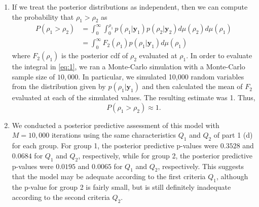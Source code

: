 \documentclass[12pt]{article}
\begin{document}
\begin{enumerate}[leftmargin=*]
\begin{enumerate}[leftmargin=1mm]
      \item If we treat the posterior distributions as independent, then we can compute the probability that $\rho_1 > \rho_2$ as
        \begin{align}
          P(\rho_1 > \rho_2) & = \int_{0}^{\infty}\int_{0}^{\rho_1}p(\rho_1|\bm{y}_1)p(\rho_2|\bm{y}_2) d\mu(\rho_2)d\mu(\rho_1) \nonumber \\
          & = \int_{0}^{\infty} F_{2}(\rho_1)p(\rho_1|\bm{y}_1) d\mu(\rho_1) \label{eq:1}
        \end{align}
        where $F_{2}(\rho_1)$ is the posterior cdf of $\rho_2$ evaluated at $\rho_1$.
        In order to evaluate the integral in \eqref{eq:1}, we ran a Monte-Carlo simulation with a Monte-Carlo sample size of $10,000$. 
        In particular, we simulated 10,000 random variables from the distribution given by $p(\rho_1|\bm{y}_1)$ and then calculated the mean 
        of $F_{2}$ evaluated at each of the simulated values. The resulting estimate was 1. Thus,
        \[
          P(\rho_1 > \rho_2) \approx 1.
        \]

      \item We conducted a posterior predictive assessment of this model with $M = 10,000$ iterations 
        using the same characteristics $Q_1$ and $Q_2$ of part 1 (d) for each group. For group 1, the posterior predictive p-values 
        were $0.3528$ and $0.0684$ for $Q_1$ and $Q_2$, respectively, while for group 2, the posterior predictive p-values were
        $0.0195$ and $0.0065$ for $Q_1$ and $Q_2$, respectively. This suggests that the model may be adequate according to the first criteria $Q_1$,
        although the p-value for group 2 is fairly small, but
        is still definitely inadequate according to the second criteria $Q_2$.


\end{enumerate}
\end{enumerate}
\end{document}
